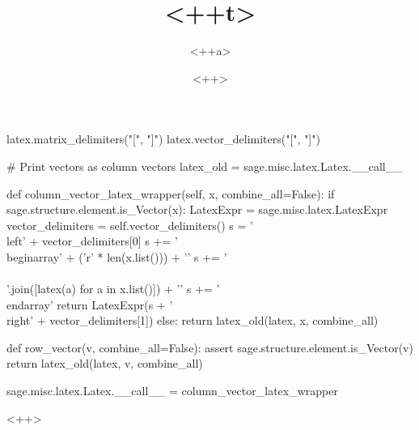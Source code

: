 \documentclass[a4paper]{article}
\title{<++t>}
\author{<++a>}
\date{<++>}
\begin{document}
\begin{sagesilent}
  latex.matrix_delimiters("[", "]")
  latex.vector_delimiters("[", "]")

  # Print vectors as column vectors
  latex_old = sage.misc.latex.Latex.__call__

  def column_vector_latex_wrapper(self, x, combine_all=False):
    if sage.structure.element.is_Vector(x):
      LatexExpr = sage.misc.latex.LatexExpr
      vector_delimiters = self.vector_delimiters()
      s = '\\left' + vector_delimiters[0]
      s += '\\begin{array}{' + ('r' * len(x.list())) + '}\n'
      s += '\\\\\n'.join([latex(a) for a in x.list()]) + '\n'
      s += '\\end{array}'
      return LatexExpr(s + '\\right' + vector_delimiters[1])
    else:
      return latex_old(latex, x, combine_all)

  def row_vector(v, combine_all=False):
    assert sage.structure.element.is_Vector(v)
    return latex_old(latex, v, combine_all)

  sage.misc.latex.Latex.__call__ = column_vector_latex_wrapper
\end{sagesilent}

\maketitle


<++>
\end{document}
